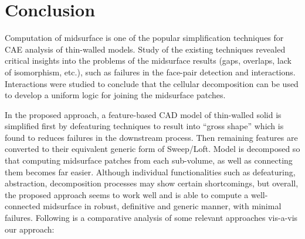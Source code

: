 \section{Conclusion}


Computation of midsurface is one of the popular simplification techniques for CAE analysis of  thin-walled models. Study of the existing techniques revealed critical insights into the problems of the  midsurface results (gaps, overlaps, lack of isomorphism, etc.), such as failures in the face-pair detection and interactions. Interactions were studied to conclude that the cellular decomposition can be used to develop a uniform logic for joining the midsurface patches.

In the proposed approach, a feature-based  CAD model of thin-walled solid is simplified first by defeaturing techniques to result into ``gross shape'' which is found to reduces failures in the  downstream process. Then remaining features are converted to their equivalent generic form of Sweep/Loft.  Model is decomposed so that computing midsurface patches from each sub-volume, as well as connecting them becomes far easier.  %
Although individual functionalities such as defeaturing, abstraction, decomposition processes may show certain shortcomings, but overall, the proposed approach seems to work well and is able to compute a well-connected midsurface in robust, definitive and generic manner, with minimal failures.  Following is a  comparative analysis of some relevant approaches vis-a-vis our approach:

